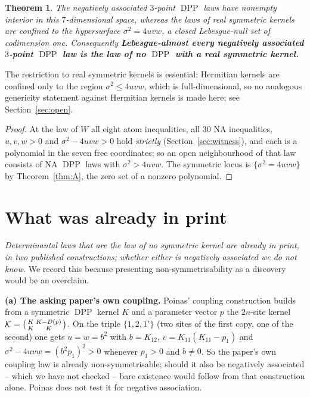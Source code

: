 \documentclass[11pt]{amsart}
\newtheorem{theorem}{Theorem}
\theoremstyle{remark}
\DeclareMathOperator{\DPP}{DPP}
\begin{document}
\begin{theorem}\label{thm:generic}
The negatively associated $3$-point $\DPP$ laws have nonempty interior in this
$7$-dimensional space, whereas the laws of real symmetric kernels are confined to the
hypersurface $\sigma^{2}=4uvw$, a closed Lebesgue-null set of codimension one. Consequently
\textbf{Lebesgue-almost every negatively associated $3$-point $\DPP$ law is the law of no
$\DPP$ with a real symmetric kernel.}
\end{theorem}

The restriction to real symmetric kernels is essential: Hermitian kernels are confined only to
the region $\sigma^{2}\le4uvw$, which is full-dimensional, so no analogous genericity statement
against Hermitian kernels is made here; see Section~\ref{sec:open}.

\begin{proof}
At the law of $W$ all eight atom inequalities, all $30$ NA inequalities, $u,v,w>0$ and
$\sigma^{2}-4uvw>0$ hold \emph{strictly} (Section~\ref{sec:witness}), and each is a
polynomial in the seven free coordinates; so an open neighbourhood of that law consists of NA
$\DPP$ laws with $\sigma^{2}>4uvw$. The symmetric locus is $\{\sigma^{2}=4uvw\}$ by
Theorem~\ref{thm:A}, the zero set of a nonzero polynomial.
\end{proof}

\section{What was already in print}\label{sec:attribution}

\emph{Determinantal laws that are the law of no symmetric kernel are already in print, in two
published constructions; whether either is negatively associated we do not know.} We record
this because presenting non-symmetrisability as a discovery would be an overclaim.

\medskip
\noindent\textbf{(a) The asking paper's own coupling.} Poinas' coupling construction
\cite[Prop.~``Construction coupling'']{Poinas} builds
from a symmetric $\DPP$ kernel $K$ and a parameter vector $p$ the $2n$-site kernel
$\mathcal K=\begin{psmallmatrix}K&K-D(p)\\K&K\end{psmallmatrix}$. On the triple
$\{1,2,1'\}$ (two sites of the first copy, one of the second) one gets $u=w=b^{2}$ with
$b=K_{12}$, $v=K_{11}(K_{11}-p_{1})$ and $\sigma^{2}-4uvw=(b^{2}p_{1})^{2}>0$ whenever
$p_{1}>0$ and $b\ne0$. So the paper's own coupling law is already non-symmetrisable; should it
also be negatively associated -- which we have not checked -- bare existence would follow from
that construction alone. Poinas does not test it for negative association.
\end{document}
